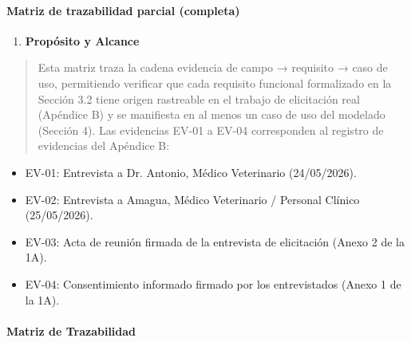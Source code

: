 \documentclass[
]{article}
\begin{document}
\paragraph{Matriz de trazabilidad parcial
(completa)}\label{matriz-de-trazabilidad-parcial-completa}

\begin{enumerate}
\def\labelenumi{\arabic{enumi}.}
\item
  \protect{}\label{_bookmark111}{}\textbf{Propósito y
  Alcance}
\end{enumerate}

\begin{quote}
Esta matriz traza la cadena evidencia de campo → requisito → caso de
uso, permitiendo verificar que cada requisito funcional formalizado en
la Sección 3.2 tiene origen rastreable en el trabajo de elicitación real
(Apéndice B) y se manifiesta en al menos un caso de uso del modelado
(Sección 4). Las evidencias EV-01 a EV-04 corresponden al registro de
evidencias del Apéndice B:
\end{quote}

\begin{itemize}
\item
  EV-01: Entrevista a Dr. Antonio, Médico Veterinario (24/05/2026).
\item
  EV-02: Entrevista a Amagua, Médico Veterinario / Personal Clínico
  (25/05/2026).
\item
  EV-03: Acta de reunión firmada de la entrevista de elicitación (Anexo
  2 de la 1A).
\item
  EV-04: Consentimiento informado firmado por los entrevistados (Anexo 1
  de la 1A).
\end{itemize}

\paragraph{Matriz de Trazabilidad}\label{matriz-de-trazabilidad-1}
\end{document}
